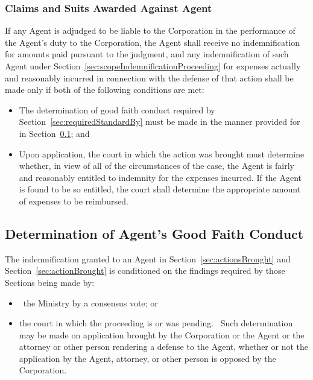 \documentclass[letterpaper,titlepage]{article}
\begin{document}
\subsubsection{Claims and Suits Awarded Against Agent}
\label{sec:claimsSuits}
If any Agent is adjudged to be liable to the Corporation in the performance of
the Agent's duty to the Corporation, the Agent shall receive no indemnification
for amounts paid pursuant to the judgment, and any indemnification of such
Agent under Section~\ref{sec:scopeIndemnificationProceeding} for expenses
actually and reasonably incurred in connection with the defense of that action
shall be made only if both of the following conditions are met:
\begin{itemize}
    \item[(1)] The determination of good faith conduct required by
        Section~\ref{sec:requiredStandardBy} must be made in the manner provided
        for in Section~\ref{sec:determinationAgent}; and
    \item[(2)] Upon application, the court in which the action was brought must
        determine whether, in view of all of the circumstances of the case, the
        Agent is fairly and reasonably entitled to indemnity for the expenses
        incurred. If the Agent is found to be so entitled, the court shall
        determine the appropriate amount of expenses to be reimbursed.
\end{itemize}

\subsection{Determination of Agent's Good Faith Conduct}
\label{sec:determinationAgent}
The indemnification granted to an Agent in Section~\ref{sec:actionsBrought} and
Section~\ref{sec:actionBrought} is conditioned on the findings required by
those Sections being made by:
\begin{itemize}
    \item[(1)] the Ministry by a consensus vote; or
    \item[(2)] the court in which the proceeding is or was pending.  Such
        determination may be made on application brought by the Corporation or
        the Agent or the attorney or other person rendering a defense to the
        Agent, whether or not the application by the Agent, attorney, or other
        person is opposed by the Corporation.
\end{itemize} 
\end{document}
